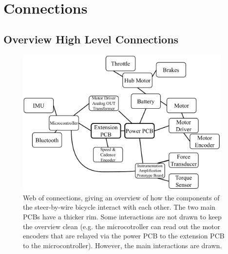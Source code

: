 \section{Connections}
\subsection{Overview High Level Connections}
\begin{figure}[h!]
    \centering
    \includegraphics[width=0.96\textwidth]{Img/Overview_sbw_system.pdf}
    \caption{Web of connections, giving an overview of how the components of the steer-by-wire bicycle interact with each other. The two main PCBs have a thicker rim. Some interactions are not drawn to keep the overview clean (e.g. the microcotroller can read out the motor encoders that are relayed via the power PCB to the extension PCB to the microcontroller). However, the main interactions are drawn.}
    \label{fig:sbw_overview}
\end{figure}

